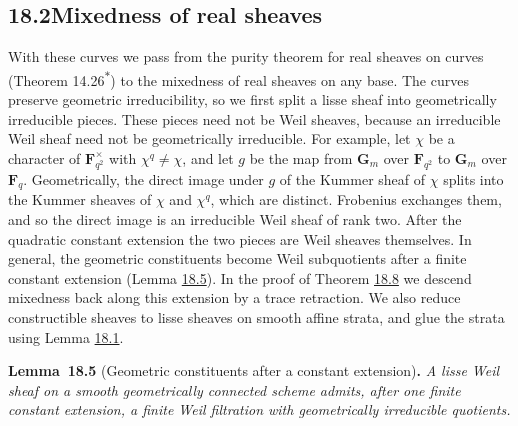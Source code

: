 \documentclass[11pt]{article}
\newenvironment{bpstatement}[2]{\par\addvspace{0.6\baselineskip}\noindent\textbf{#1}#2\textbf{.}\enspace\ignorespaces}
  {\par\addvspace{0.4\baselineskip}}
\newenvironment{bpstatementit}[2]{\begin{bpstatement}{#1}{#2}\itshape\ignorespaces}{\end{bpstatement}}
\newcommand{\bpout}[1]{#1\textsuperscript{\hyperlink{bp-outside}{\ensuremath{\ast}}}}
\begin{document}
\subsection*{\texorpdfstring{18.2\quad Mixedness of real sheaves}{18.2 Mixedness of real sheaves}}
\label{bp16}%
\label{bp17}%
With these curves we pass from the purity theorem for real sheaves on curves (Theorem \bpout{14.26}) to the mixedness of real sheaves on any base. The curves preserve geometric irreducibility, so we first split a lisse sheaf into geometrically irreducible pieces. These pieces need not be Weil sheaves, because an irreducible Weil sheaf need not be geometrically irreducible. For example, let \(\chi\) be a character of \(\mathbf F_{q^2}^\times\) with \(\chi^q\ne\chi\), and let \(g\) be the map from \(\mathbf G_m\) over \(\mathbf F_{q^2}\) to \(\mathbf G_m\) over \(\mathbf F_q\). Geometrically, the direct image under \(g\) of the Kummer sheaf of \(\chi\) splits into the Kummer sheaves of \(\chi\) and \(\chi^q\), which are distinct. Frobenius exchanges them, and so the direct image is an irreducible Weil sheaf of rank two. After the quadratic constant extension the two pieces are Weil sheaves themselves. In general, the geometric constituents become Weil subquotients after a finite constant extension (Lemma \hyperref[bp18]{18.5}). In the proof of Theorem \hyperref[bp25]{18.8} we descend mixedness back along this extension by a trace retraction. We also reduce constructible sheaves to lisse sheaves on smooth affine strata, and glue the strata using Lemma \hyperref[bp5]{18.1}.

\label{bp18}%
\begin{bpstatementit}{Lemma~18.5}{ (Geometric constituents after a constant extension)}
A lisse Weil sheaf on a smooth geometrically connected scheme admits, after one finite constant extension, a finite Weil filtration with geometrically irreducible quotients.
\end{bpstatementit}
\end{document}
